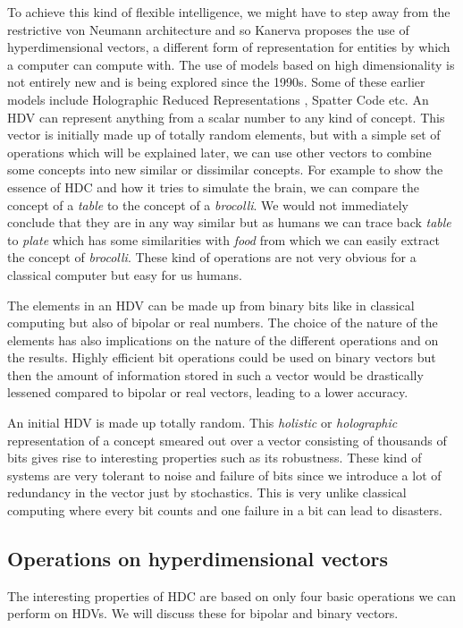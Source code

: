 To achieve this kind of flexible intelligence, we might have to step away from the restrictive von Neumann architecture and so Kanerva proposes the use of hyperdimensional vectors, a different form of representation for entities by which a computer can compute with. The use of models based on high dimensionality is not entirely new and is being explored since the 1990s. Some of these earlier models include Holographic Reduced Representations \cite{HRR}, Spatter Code \cite{spatter} etc. An HDV can represent anything from a scalar number to any kind of concept. This vector is initially made up of totally random elements, but with a simple set of operations which will be explained later, we can use other vectors to combine some concepts into new similar or dissimilar concepts. For example to show the essence of HDC and how it tries to simulate the brain, we can compare the concept of a \textit{table} to the concept of a \textit{brocolli}. We would not immediately conclude that they are in any way similar but as humans we can trace back \textit{table} to \textit{plate} which has some similarities with \textit{food} from which we can easily extract the concept of \textit{brocolli}. These kind of operations are not very obvious for a classical computer but easy for us humans. 

The elements in an HDV can be made up from binary bits like in classical computing but also of bipolar or real numbers. The choice of the nature of the elements has also implications on the nature of the different operations and on the results. Highly efficient bit operations could be used on binary vectors but then the amount of information stored in such a vector would be drastically lessened compared to bipolar or real vectors, leading to a lower accuracy.  

An initial HDV is made up totally random. This \textit{holistic} or \textit{holographic} representation of a concept smeared out over a vector consisting of thousands of bits gives rise to interesting properties such as its robustness. These kind of systems are very tolerant to noise and failure of bits since we introduce a lot of redundancy in the vector just by stochastics. This is very unlike classical computing where every bit counts and one failure in a bit can lead to disasters. 
\subsection*{Operations on hyperdimensional vectors}
The interesting properties of HDC are based on only four basic operations we can perform on HDVs. We will discuss these for bipolar and binary vectors.
